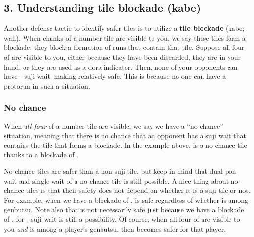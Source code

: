 {{\bigskip
\subsection*{3. Understanding tile blockade ({\jap kabe})} \label{sec:blockade}
Another defense tactic to identify safer tiles is to utilize a {\bf tile blockade} ({\jap kabe}; wall). When chunks of a number tile are visible to you, we say these tiles form a blockade; they block a formation of runs that contain that tile. Suppose all four of {\LARGE{}} are visible to you, either because they have been discarded, they are in your hand, or they are used as a {\jap dora} indicator.
Then, none of your opponents can have {\LARGE{}-} {\jap suji} wait, making {\LARGE{}} relatively safe. This is because no one can have a protorun {\LARGE{}} in such a situation. 

\subsubsection{No chance}
When \emph{all four} of a number tile are visible, we say we have a ``no chance'' situation, meaning that there is no chance that an opponent has a {\jap suji} wait that contains the tile that forms a blockade. In the example above, {\LARGE{}} is a no-chance tile thanks to a blockade of {\LARGE{}}. 

\bigskip
No-chance tiles are safer than a non-{\jap suji} tile, but keep in mind that dual {\jap pon} wait and single wait of a no-chance tile is still possible. 
A nice thing about no-chance tiles is that their safety does not depend on whether it is a {\jap suji} tile or not. For example, when we have a blockade of {\LARGE{}}, {\LARGE{}} is safe regardless of whether {\LARGE{}} is among {\jap genbutsu}. Note also that {\LARGE{}} is not necessarily safe just because we have a blockade of {\LARGE{}}, for {\LARGE{}-} {\jap suji} wait is still a possibility. 
Of course, when all four of {\LARGE{}} are visible to you \emph{and} {\LARGE{}} is among a player's {\jap genbutsu}, then {\LARGE{}} becomes safer for that player. 

}}
